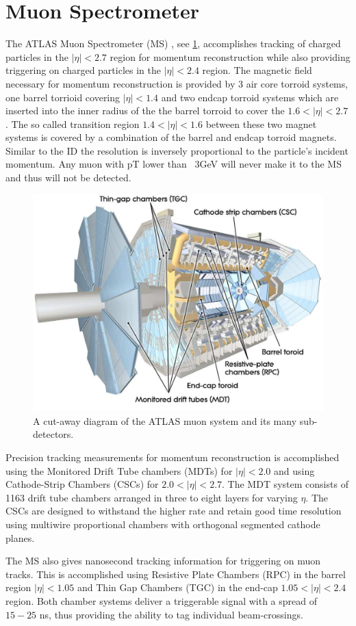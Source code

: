 \section{Muon Spectrometer} \label{sec:atlas:muons}

The ATLAS Muon Spectrometer (MS) \cite{PERF-2007-01}, see
\cref{fig:muon_system}, accomplishes tracking of charged particles in the $|\eta|
< 2.7$ region for momentum reconstruction while also providing triggering on
charged particles in the $|\eta| < 2.4$ region.  The magnetic field necessary
for momentum reconstruction is provided by 3 air core torroid systems, one
barrel torrioid covering $|\eta| < 1.4$ and two endcap torroid systems which are
inserted into the inner radius of the the barrel torroid to cover the $1.6 <
|\eta| < 2.7$. The so called transition region $1.4 < |\eta| < 1.6$ between
these two magnet systems is covered by a combination of the barrel and endcap
torroid magnets.  Similar to the ID the resolution is inversely proportional to
the particle's incident momentum.  Any muon with pT lower than ~3GeV will never
make it to the MS and thus will not be detected.  

\begin{figure}[!htbp]
  \begin{center}
    \includegraphics[width=0.8\linewidth]{figures/atlas/muon_system}
    \caption{ \cite{PERF-2007-01} A cut-away diagram of the ATLAS muon system
and its many sub-detectors.}
    \label{fig:muon_system}
  \end{center}
\end{figure}

Precision tracking measurements for momentum reconstruction is accomplished
using the Monitored Drift Tube chambers (MDTs) for $|\eta| < 2.0$ and using
Cathode-Strip Chambers (CSCs) for $2.0 < |\eta| < 2.7$.  The MDT system consists of
1163 drift tube chambers arranged in three to eight layers for varying $\eta$.
The CSCs are designed to withstand the higher rate and retain good time
resolution using multiwire proportional chambers with orthogonal segmented
cathode planes.

The MS also gives nanosecond tracking information for triggering on muon tracks.
This is accomplished using Resistive Plate Chambers (RPC) in the barrel region
$|\eta| < 1.05$ and Thin Gap Chambers (TGC) in the end-cap $1.05 < |\eta| < 2.4$
region.  Both chamber systems deliver a triggerable signal with a spread of
$15-25$ ns, thus providing the ability to tag individual beam-crossings.

